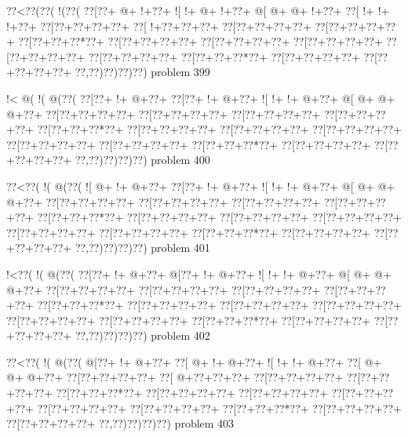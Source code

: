 \vbox{\vbox{\goo
\0??<\0??(\0??(\- !(\0??(
\0??[\0??+\- @+\- !+\0??+
\- ![\- !+\- @+\- !+\0??+
\- @[\- @+\- @+\- !+\0??+
\0??[\- !+\- !+\- !+\0??+
\0??[\0??+\0??+\0??+\0??+
\0??[\- !+\0??+\0??+\0??+
\0??[\0??+\0??+\0??+\0??+
\0??[\0??+\0??+\0??+\0??+
\0??[\0??+\0??+\0??*\0??+
\0??[\0??+\0??+\0??+\0??+
\0??[\0??+\0??+\0??+\0??+
\0??[\0??+\0??+\0??+\0??+
\0??[\0??+\0??+\0??+\0??+
\0??[\0??+\0??+\0??+\0??+
\0??[\0??+\0??+\0??*\0??+
\0??[\0??+\0??+\0??+\0??+
\0??[\0??+\0??+\0??+\0??+
\0??,\0??)\0??)\0??)\0??)
}
\hfil problem 399\hfil\break
}

\vbox{\vbox{\goo
\- !<\- @(\- !(\- @(\0??(
\0??[\0??+\- !+\- @+\0??+
\0??[\0??+\- !+\- @+\0??+
\- ![\- !+\- !+\- @+\0??+
\- @[\- @+\- @+\- @+\0??+
\0??[\0??+\0??+\0??+\0??+
\0??[\0??+\0??+\0??+\0??+
\0??[\0??+\0??+\0??+\0??+
\0??[\0??+\0??+\0??+\0??+
\0??[\0??+\0??+\0??*\0??+
\0??[\0??+\0??+\0??+\0??+
\0??[\0??+\0??+\0??+\0??+
\0??[\0??+\0??+\0??+\0??+
\0??[\0??+\0??+\0??+\0??+
\0??[\0??+\0??+\0??+\0??+
\0??[\0??+\0??+\0??*\0??+
\0??[\0??+\0??+\0??+\0??+
\0??[\0??+\0??+\0??+\0??+
\0??,\0??)\0??)\0??)\0??)
}
\hfil problem 400\hfil\break
}

\vbox{\vbox{\goo
\0??<\0??(\- !(\- @(\0??(
\- ![\- @+\- !+\- @+\0??+
\0??[\0??+\- !+\- @+\0??+
\- ![\- !+\- !+\- @+\0??+
\- @[\- @+\- @+\- @+\0??+
\0??[\0??+\0??+\0??+\0??+
\0??[\0??+\0??+\0??+\0??+
\0??[\0??+\0??+\0??+\0??+
\0??[\0??+\0??+\0??+\0??+
\0??[\0??+\0??+\0??*\0??+
\0??[\0??+\0??+\0??+\0??+
\0??[\0??+\0??+\0??+\0??+
\0??[\0??+\0??+\0??+\0??+
\0??[\0??+\0??+\0??+\0??+
\0??[\0??+\0??+\0??+\0??+
\0??[\0??+\0??+\0??*\0??+
\0??[\0??+\0??+\0??+\0??+
\0??[\0??+\0??+\0??+\0??+
\0??,\0??)\0??)\0??)\0??)
}
\hfil problem 401\hfil\break
}

\vbox{\vbox{\goo
\- !<\0??(\- !(\- @(\0??(
\0??[\0??+\- !+\- @+\0??+
\- @[\0??+\- !+\- @+\0??+
\- ![\- !+\- !+\- @+\0??+
\- @[\- @+\- @+\- @+\0??+
\0??[\0??+\0??+\0??+\0??+
\0??[\0??+\0??+\0??+\0??+
\0??[\0??+\0??+\0??+\0??+
\0??[\0??+\0??+\0??+\0??+
\0??[\0??+\0??+\0??*\0??+
\0??[\0??+\0??+\0??+\0??+
\0??[\0??+\0??+\0??+\0??+
\0??[\0??+\0??+\0??+\0??+
\0??[\0??+\0??+\0??+\0??+
\0??[\0??+\0??+\0??+\0??+
\0??[\0??+\0??+\0??*\0??+
\0??[\0??+\0??+\0??+\0??+
\0??[\0??+\0??+\0??+\0??+
\0??,\0??)\0??)\0??)\0??)
}
\hfil problem 402\hfil\break
}

\vbox{\vbox{\goo
\0??<\0??(\- !(\- @(\0??(
\- @[\0??+\- !+\- @+\0??+
\0??[\- @+\- !+\- @+\0??+
\- ![\- !+\- !+\- @+\0??+
\0??[\- @+\- @+\- @+\0??+
\0??[\0??+\0??+\0??+\0??+
\0??[\- @+\0??+\0??+\0??+
\0??[\0??+\0??+\0??+\0??+
\0??[\0??+\0??+\0??+\0??+
\0??[\0??+\0??+\0??*\0??+
\0??[\0??+\0??+\0??+\0??+
\0??[\0??+\0??+\0??+\0??+
\0??[\0??+\0??+\0??+\0??+
\0??[\0??+\0??+\0??+\0??+
\0??[\0??+\0??+\0??+\0??+
\0??[\0??+\0??+\0??*\0??+
\0??[\0??+\0??+\0??+\0??+
\0??[\0??+\0??+\0??+\0??+
\0??,\0??)\0??)\0??)\0??)
}
\hfil problem 403\hfil\break
}

